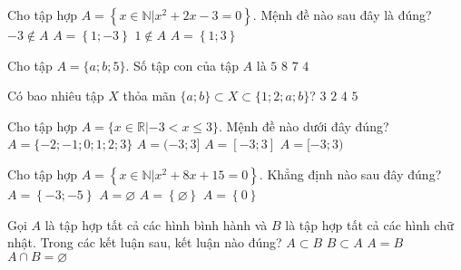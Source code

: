 \begin{ex}%
	Cho tập hợp $A=\left\{ x \in \mathbb{N}| x^2+2x-3=0 \right\}$. Mệnh đề nào sau đây là đúng?
	\choice
	{\True $-3 \notin A$}
	{$A=\left\{1;-3\right\}$}
	{$1 \notin A$}
	{$A=\left\{1;3\right\}$}
\end{ex}
\begin{ex}%
	Cho tập $A=\{a;b;5\}$. Số tập con của tập $A$ là
	\choice
	{$5$}
	{\True $8$}
	{$7$}
	{$4$}
\end{ex}
\begin{ex}%
	Có bao nhiêu tập $ X $ thỏa mãn $ \{a;b\} \subset X \subset \{1;2;a;b\}$?
	\choice
	{$3$}
	{$2$}
	{\True $4$}
	{$5$}
\end{ex}
\begin{ex}%
	Cho tập hợp $A=\{x\in\mathbb{R}|-3<x\le 3\}$. Mệnh đề nào dưới đây đúng?
	\choice
	{$A=\{-2;-1;0;1;2;3\}$}
	{\True $A=(-3;3]$}
	{$A=[-3;3]$}
	{$A=[-3;3)$}
	\loigiai{
		Từ giả thiết, có $A=(-3;3]$.
	}
\end{ex}
\begin{ex}%
	Cho tập hợp $A = \left\{x \in \mathbb{N}\big| x^2 + 8x + 15 = 0\right\}$. Khẳng định nào sau đây đúng?
	\choice
	{$A = \left\{-3;-5\right\}$}
	{\True $A =\varnothing$}
	{$A = \left\{\varnothing\right\}$}
	{$A = \left\{0\right\}$}
\end{ex}
\begin{ex}%
	Gọi $A$ là tập hợp tất cả các hình bình hành và $B$ là tập hợp tất cả các hình chữ nhật. Trong các kết luận sau, kết luận nào đúng?
	\choice
	{$A \subset B$}
	{\True $B \subset A$}
	{$A=B$}
	{$A \cap B=\varnothing$}
\end{ex}

